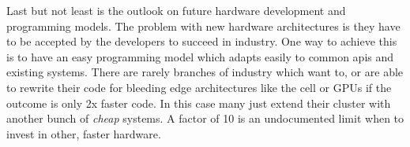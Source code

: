 Last but not least is the outlook on future hardware development and programming
models. The problem with new hardware architectures is they have to be accepted
by the developers to succeed in industry. One way to achieve this is to have an
easy programming model which adapts easily to common apis and existing systems.
There are rarely branches of industry which want to, or are able to rewrite
their code for bleeding edge architectures like the cell or GPUs if the outcome
is only 2x faster code. In this case many just extend their cluster with another
bunch of \emph{cheap} systems. A factor of 10 is an undocumented limit when to
invest in other, faster hardware.

